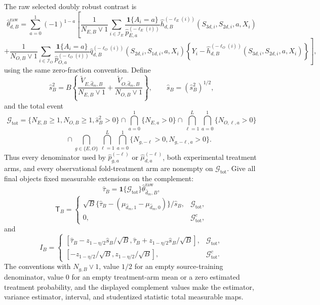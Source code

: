 The raw selected doubly robust contrast is
\[
 \widehat\theta_{d,B}^{\mathrm{raw}}
 =\sum_{a=0}^1(-1)^{1-a}\left[
 \frac{1}{N_{E,B}\vee1}\sum_{i\in\mathcal I_E}
 \frac{\mathbf 1\{A_i=a\}}{\widehat p_{E,a}^{(-\ell_E(i))}}
 \widehat h_{d,B}^{(-\ell_E(i))}(S_{3d,i},S_{2d,i},a,X_i)
 \right.
\]
\[
 \left.
 +\frac{1}{N_{O,B}\vee1}\sum_{i\in\mathcal I_O}
 \frac{\mathbf 1\{A_i=a\}}{\widehat p_{O,a}^{(-\ell_O(i))}}
 \widehat q_{d,B}^{(-\ell_O(i))}(S_{2d,i},S_{1d,i},a,X_i)
 \left\{Y_i-
 \widehat h_{d,B}^{(-\ell_O(i))}(S_{3d,i},S_{2d,i},a,X_i)
 \right\}
 \right],
\]
using the same zero-fraction convention. Define
\[
 \widehat s_B^2
 =B\left\{
 \frac{\widetilde V_{E,\widehat d_m,B}}{N_{E,B}\vee1}
 +\frac{\widetilde V_{O,\widehat d_m,B}}{N_{O,B}\vee1}
 \right\},
 \qquad
 \widehat s_B=(\widehat s_B^2)^{1/2},
\]
and the total event
\[
 \mathcal G_{\mathrm{tot}}
 =\{N_{E,B}\ge1,N_{O,B}\ge1,\widehat s_B^2>0\}
 \cap\bigcap_{a=0}^1\{N_{E,a}>0\}
 \cap\bigcap_{\ell=1}^L\bigcap_{a=0}^1\{N_{O,\ell,a}>0\}
\]
\[
 \hspace{2em}\cap
 \bigcap_{g\in\{E,O\}}\bigcap_{\ell=1}^L\bigcap_{a=0}^1
 \{N_{g,-\ell}>0,N_{g,-\ell,a}>0\}.
\]
Thus every denominator used by \(\widehat p_{g,a}^{(-\ell)}\) or \(\widehat\mu_{d,a}^{(-\ell)}\), both experimental treatment arms, and every observational fold-treatment arm are nonempty on \(\mathcal G_{\mathrm{tot}}\). Give all final objects fixed measurable extensions on the complement:
\[
 \widehat\tau_B
 =\mathbf 1\{\mathcal G_{\mathrm{tot}}\}
 \widehat\theta_{\widehat d_m,B}^{\mathrm{raw}},
\]
\[
 \mathsf T_B
 =\begin{cases}
 \sqrt B\{\widehat\tau_B-(\mu_{\widehat d_m,1}-\mu_{\widehat d_m,0})\}/\widehat s_B,
 &\mathcal G_{\mathrm{tot}},\\
 0,&\mathcal G_{\mathrm{tot}}^c,
 \end{cases}
\]
and
\[
 I_B=\begin{cases}
 [\widehat\tau_B-z_{1-\eta/2}\widehat s_B/\sqrt B,
 \widehat\tau_B+z_{1-\eta/2}\widehat s_B/\sqrt B],
 &\mathcal G_{\mathrm{tot}},\\
 [-z_{1-\eta/2}/\sqrt B,z_{1-\eta/2}/\sqrt B],
 &\mathcal G_{\mathrm{tot}}^c.
 \end{cases}
\]
The conventions with \(N_{g,B}\vee1\), value \(1/2\) for an empty source-training denominator, value \(0\) for an empty treatment-arm mean or a zero estimated treatment probability, and the displayed complement values make the estimator, variance estimator, interval, and studentized statistic total measurable maps.